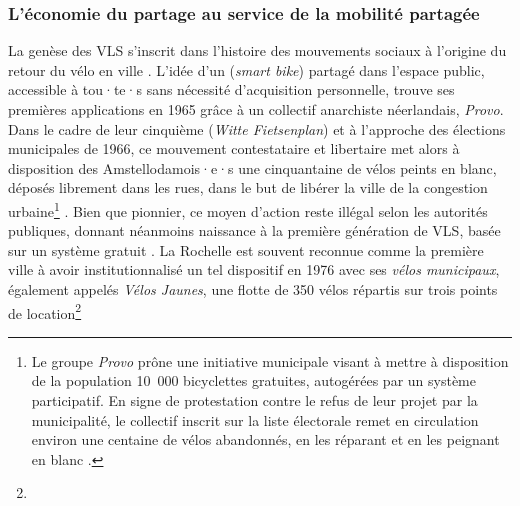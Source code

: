\begin{refsegment}
\subsubsection*{L'économie du partage au service de la mobilité partagée
    \label{chap1:velo-micromobilite-innovations-partage}
    }

La genèse des \acrshort{VLS} s’inscrit dans l’histoire des mouvements sociaux à l’origine du retour du vélo en ville \textcolor{blue}{\autocite[23]{hure_mobilites_2019}}. L’idée d’un  (\textsl{smart bike}) partagé dans l’espace public, accessible à tou·te·s sans nécessité d’acquisition personnelle, trouve ses premières applications en 1965 grâce à un collectif anarchiste néerlandais, \textsl{Provo}. Dans le cadre de leur cinquième  (\textsl{Witte Fietsenplan}) et à l'approche des élections municipales de 1966, ce mouvement contestataire et libertaire met alors à disposition des Amstellodamois·e·s une cinquantaine de vélos peints en blanc, déposés librement dans les rues, dans le but de libérer la ville de la congestion urbaine\footnote{
    Le groupe \textsl{Provo} prône une initiative municipale visant à mettre à disposition de la population 10~000 bicyclettes gratuites, autogérées par un système participatif. En signe de protestation contre le refus de leur projet par la municipalité, le collectif inscrit sur la liste électorale remet en circulation environ une centaine de vélos abandonnés, en les réparant et en les peignant en blanc \textcolor{blue}{\autocite[29]{hure_mobilites_2019}}.
} \textcolor{blue}{\autocites[6]{smart_provo_2012}{demain_la_ville_doit-velib_2018}}. Bien que pionnier, ce moyen d'action reste illégal selon les autorités publiques, donnant néanmoins naissance à la première génération de \acrshort{VLS}, basée sur un système gratuit \textcolor{blue}{\autocite[160]{shaheen_bikesharing_2010}}. La Rochelle est souvent reconnue comme la première ville à avoir institutionnalisé un tel dispositif en 1976 avec ses \textsl{vélos municipaux}, également appelés \textsl{Vélos Jaunes}, une flotte de 350 vélos répartis sur trois points de location\footnote{
}
\end{refsegment}
